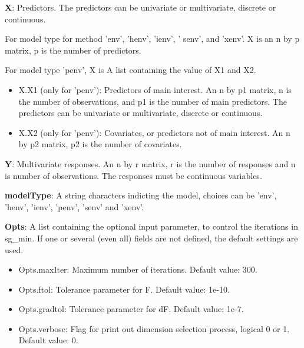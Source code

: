 \documentclass[a4paper,11pt,openany]{memoir}
\begin{document}
\begin{par}
\textbf{X}: Predictors.   The predictors can be univariate or multivariate, discrete or continuous.
\end{par} \vspace{1em}
\begin{par}
For model type for method 'env', 'henv', 'ienv', ' senv', and 'xenv'. X is an n by p matrix, p is the number of predictors.
\end{par} \vspace{1em}
\begin{par}
For model type 'penv', X is  A list containing the value of X1 and X2.
\end{par} \vspace{1em}
\begin{itemize}
\setlength{\itemsep}{-1ex}
   \item X.X1 (only for 'penv'): Predictors of main interest. An n by p1 matrix, n is the number of observations, and p1 is the number of main predictors. The predictors can be univariate or multivariate, discrete or continuous.
   \item X.X2 (only for 'penv'): Covariates, or predictors not of main interest.  An n by p2 matrix, p2 is the number of covariates.
\end{itemize}
\begin{par}
\textbf{Y}: Multivariate responses. An n by r matrix, r is the number of responses and n is number of observations. The responses must be continuous variables.
\end{par} \vspace{1em}
\begin{par}
\textbf{modelType}: A string characters indicting the model, choices can be 'env', 'henv', 'ienv', 'penv', 'senv' and 'xenv'.
\end{par} \vspace{1em}
\begin{par}
\textbf{Opts}: A list containing the optional input parameter, to control the iterations in sg\_min. If one or several (even all) fields are not defined, the default settings are used.
\end{par} \vspace{1em}
\begin{itemize}
\setlength{\itemsep}{-1ex}
   \item Opts.maxIter: Maximum number of iterations.  Default value: 300.
   \item Opts.ftol: Tolerance parameter for F.  Default value: 1e-10.
   \item Opts.gradtol: Tolerance parameter for dF.  Default value: 1e-7.
   \item Opts.verbose: Flag for print out dimension selection process, logical 0 or 1. Default value: 0.
\end{itemize}
\end{document}
